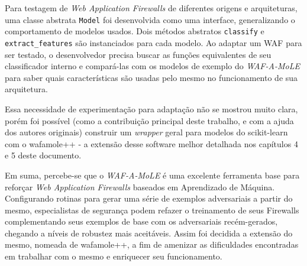 Para testagem de \textit{Web Application Firewalls} de diferentes origens e arquiteturas, uma classe abstrata \verb+Model+ foi desenvolvida como uma interface, generalizando o comportamento de modelos usados. Dois métodos abstratos \verb+classify+ e \verb+extract_features+ são instanciados para cada modelo. Ao adaptar um WAF para ser testado, o desenvolvedor precisa buscar as funções equivalentes de seu classificador interno e compará-las com os modelos de exemplo do \textit{WAF-A-MoLE} para saber quais características são usadas pelo mesmo no funcionamento de sua arquitetura.

Essa necessidade de experimentação para adaptação não se mostrou muito clara, porém foi possível (como a contribuição principal deste trabalho, e com a ajuda dos autores originais) construir um \textit{wrapper} geral para modelos do scikit-learn com o wafamole++ - a extensão desse software melhor detalhada nos capítulos 4 e 5 deste documento.

Em suma, percebe-se que o \textit{WAF-A-MoLE} é uma excelente ferramenta base para reforçar \textit{Web Application Firewalls} baseados em Aprendizado de Máquina. Configurando rotinas para gerar uma série de exemplos adversariais a partir do mesmo, especialistas de segurança podem refazer o treinamento de seus Firewalls complementando seus exemplos de base com os adversariais recém-gerados, chegando a níveis de robustez mais aceitáveis. Assim foi decidida a extensão do mesmo, nomeada de wafamole++, a fim de amenizar as dificuldades encontradas em trabalhar com o mesmo e enriquecer seu funcionamento.



